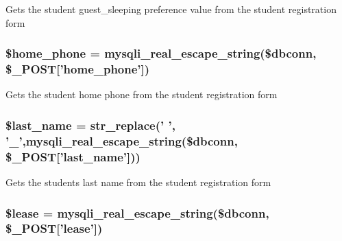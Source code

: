 \-Gets the student guest\-\_\-sleeping preference value from the student registration form \hypertarget{user__view_2validate_2studentVal_8php_af8981335f6e9218851c725816b60158e}{
\subsubsection[{\$home\-\_\-phone}]{\setlength{\rightskip}{0pt plus 5cm}\$home\-\_\-phone = mysqli\-\_\-real\-\_\-escape\-\_\-string(\$dbconn, \$\-\_\-\-P\-O\-S\-T\mbox{[}'home\-\_\-phone'\mbox{]})}}\label{user__view_2validate_2studentVal_8php_af8981335f6e9218851c725816b60158e}
\-Gets the student home phone from the student registration form \hypertarget{user__view_2validate_2studentVal_8php_a7aa024f049337e3bb2365d4007262847}{
\subsubsection[{\$last\-\_\-name}]{\setlength{\rightskip}{0pt plus 5cm}\$last\-\_\-name = str\-\_\-replace(' ', '\-\_\-',mysqli\-\_\-real\-\_\-escape\-\_\-string(\$dbconn, \$\-\_\-\-P\-O\-S\-T\mbox{[}'last\-\_\-name'\mbox{]}))}}\label{user__view_2validate_2studentVal_8php_a7aa024f049337e3bb2365d4007262847}
\-Gets the students last name from the student registration form \hypertarget{user__view_2validate_2studentVal_8php_ae95126b1133cf958aaf8a31b0283364c}{
\subsubsection[{\$lease}]{\setlength{\rightskip}{0pt plus 5cm}\$lease = mysqli\-\_\-real\-\_\-escape\-\_\-string(\$dbconn, \$\-\_\-\-P\-O\-S\-T\mbox{[}'lease'\mbox{]})}}\label{user__view_2validate_2studentVal_8php_ae95126b1133cf958aaf8a31b0283364c}
